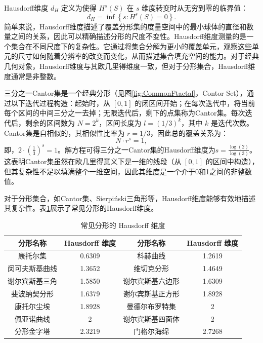 Hausdorff维度 $d_H$ 定义为使得 $H^s(S)$ 在 $s$ 维度转变时从无穷到零的临界值：
\begin{equation}
d_H = \inf \left\{ s : H^s(S) = 0 \right\}.
\end{equation}
简单来说，Hausdorff维度描述了覆盖分形集的度量空间中的最小球体的直径和数量之间的关系，因此可以精确描述分形的尺度不变性。Hausdorff维度测量的是一个集合在不同尺度下的复杂性。它通过将集合分解为更小的覆盖单元，观察这些单元的尺寸如何随着分辨率的改变而变化，从而描述集合填充空间的能力。对于经典几何对象，Hausdorff维度与其欧几里得维度一致，但对于分形集合，Hausdorff维度通常是非整数。

三分之一Cantor集是一个经典分形（见图\ref{fig:CommonFtactal}，Contor Set），通过以下迭代过程构造：起始时，从 $[0, 1]$ 的闭区间开始；在每次迭代中，将当前每个区间的中间三分之一去掉；无限迭代后，剩下的点集称为Cantor集。每次迭代后，剩余的区间数为 $N = 2^k$，区间长度为 $l = (1/3)^k$，其中 $k$ 是迭代次数。Cantor集是自相似的，其相似性比率为 $r = 1/3$，因此总的覆盖关系为：
\begin{equation}
    N \cdot r^s = 1,
\end{equation}
即，$2 \cdot \left(\frac{1}{3}\right)^s = 1$。解方程可得三分之一Cantor集的Hausdorff维度为$s = \frac{\log(2)}{\log(3)}$。这表明Cantor集虽然在欧几里得意义下是一维的线段（从 $[0,1]$ 的区间中构造），但其复杂性不足以填满整个一维空间，因此其维度是一个介于0和1之间的非整数值。
 
对于分形集合，如Cantor集、Sierpiński三角形等，Hausdorff维度能够有效地描述其复杂性。表\ref{tab:FracDim}展示了常见分形的Hausdorff维度。

\begin{table}[h!]
\centering
\begin{tabular}{|c|c|c|c|}
\toprule
\textbf{分形名称} & \textbf{Hausdorff 维度} & \textbf{分形名称} & \textbf{Hausdorff 维度}\\
\midrule
康托尔集 & 0.6309 & 科赫曲线 & 1.2619\\
闵可夫斯基曲线 & 1.3652 & 维切克分形 & 1.4649\\
谢尔宾斯基三角 & 1.5850 & 谢尔宾斯基六边形 & 1.6309\\
斐波纳契分形 & 1.6379 & 谢尔宾斯基正方形 & 1.8928\\
康托尔尘埃 & 1.8928 & 曼德尔布罗特集 & 2\\
佩亚诺曲线 & 2 & 谢尔宾斯基四面体 & 2\\
分形金字塔 & 2.3219 & 门格尔海绵 & 2.7268\\
\bottomrule
\end{tabular}
\caption{常见分形的 Hausdorff 维度}
\label{tab:FracDim}
\end{table}


